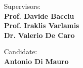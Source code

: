 \begin{titlepage}
\begin{minipage}[t]{0.47\textwidth}
	{\large{Supervisors:}{
	\normalsize \vspace{3mm}
	\bf \\ \large{Prof. Davide Bacciu} \normalsize \vspace{3mm}
	\bf \\ \large{Prof. Iraklis Varlamis}
	\normalsize \vspace{3mm}
	\bf \\ \large{Dr. Valerio De Caro}
	}}
\end{minipage}
\hfill
\begin{minipage}[t]{0.47\textwidth}\raggedleft
	{\large{Candidate:}{\normalsize\vspace{3mm} \bf\\ \large{Antonio Di Mauro}}}
\end{minipage}

\vspace{12mm}
\hrulefill
\\

\end{titlepage}
